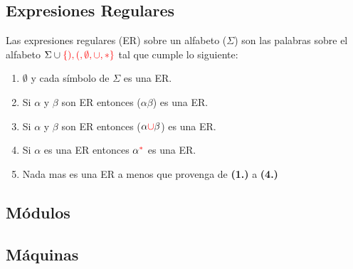 \subsection{Expresiones Regulares}
Las expresiones regulares (ER) sobre un alfabeto ($\Sigma$) son las palabras sobre el alfabeto $\Sigma \cup {\color{red}\{ ), (, \emptyset, \cup,*\}}$ tal que cumple lo siguiente:
\renewcommand{\labelenumi}{\theenumi}
\renewcommand{\theenumi}{\textbf{\arabic {enumi}.)}}%
\begin{enumerate}
\item {\color{red}$\emptyset$} y cada símbolo de $\Sigma$ es una ER.
\item Si $\alpha$ y $\beta$ son ER entonces {\color{red}(}$\alpha\beta${\color{red})} es una ER.
\item Si $\alpha$ y $\beta$ son ER entonces {\color{red}(}$\alpha{\color{red}\cup}\beta${\color{red})} es una ER.
\item Si $\alpha$ es una ER entonces $\alpha^{{\color{red}*}}$ es una ER.
\item Nada mas es una ER a menos que provenga de \textbf{(1.)} a \textbf{(4.)}
\end{enumerate}
\subsection{Módulos}
\subsection{Máquinas}